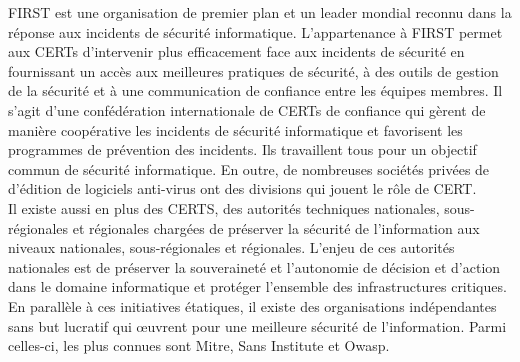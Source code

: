 FIRST est une organisation de premier plan et un leader mondial reconnu dans la réponse aux incidents de sécurité informatique. L'appartenance à FIRST permet aux CERTs d'intervenir plus efficacement face aux incidents de sécurité en fournissant un accès aux meilleures pratiques de sécurité, à des outils de gestion de la sécurité et à une communication de confiance entre les équipes membres. Il s'agit d'une confédération internationale de CERTs de confiance qui gèrent de manière coopérative les incidents de sécurité informatique et favorisent les programmes de prévention des incidents. Ils travaillent tous pour un objectif commun de sécurité informatique. En outre, de nombreuses sociétés privées de d’édition de logiciels anti-virus ont des divisions qui jouent le rôle de CERT.\\
Il existe aussi en plus des CERTS, des autorités techniques nationales, sous-régionales et régionales chargées de préserver la sécurité de l’information aux niveaux nationales, sous-régionales et régionales. L’enjeu de ces autorités nationales est de préserver la souveraineté et l’autonomie de décision et d’action dans le domaine informatique et protéger l’ensemble des infrastructures critiques. \\
En parallèle à ces initiatives étatiques, il existe des organisations indépendantes sans but lucratif qui œuvrent pour une meilleure sécurité de l’information. Parmi celles-ci, les plus connues sont Mitre, Sans Institute et Owasp.

\clearpage 

